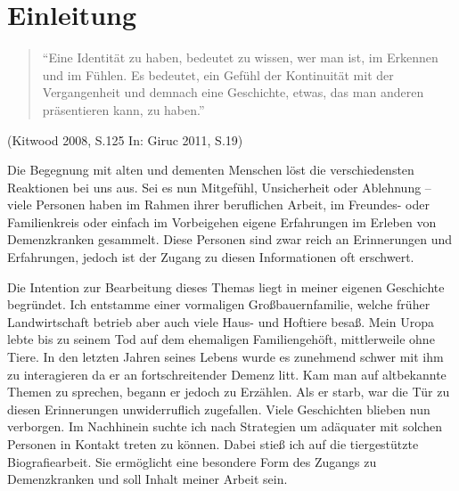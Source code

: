 \section{Einleitung}
\label{sec:k1_Einleitung}

\begin{quotation}
"`Eine Identität zu haben, bedeutet zu wissen, wer man ist, im Erkennen und im Fühlen. Es bedeutet, ein Gefühl der Kontinuität mit der Vergangenheit und demnach eine Geschichte, etwas, das man anderen präsentieren kann, zu haben."'
\end{quotation}

\begin{flushright}
(Kitwood 2008, S.125 In: Giruc 2011, S.19)
\end{flushright}

Die Begegnung mit alten und dementen Menschen löst die verschiedensten Reaktionen bei uns aus. Sei es nun Mitgefühl, Unsicherheit oder Ablehnung -- viele Personen haben im Rahmen ihrer beruflichen Arbeit, im Freundes- oder Familienkreis oder einfach im Vorbeigehen eigene Erfahrungen im Erleben von Demenzkranken gesammelt. Diese Personen sind zwar reich an Erinnerungen und Erfahrungen, jedoch ist der Zugang zu diesen Informationen oft erschwert.
 
Die Intention zur Bearbeitung dieses Themas liegt in meiner eigenen Geschichte begründet. Ich entstamme einer vormaligen Großbauernfamilie, welche früher Landwirtschaft betrieb aber auch viele Haus- und Hoftiere besaß. Mein Uropa lebte bis zu seinem Tod auf dem ehemaligen Familiengehöft, mittlerweile ohne Tiere. In den letzten Jahren seines Lebens wurde es zunehmend schwer mit ihm zu interagieren da er an fortschreitender Demenz litt. Kam man auf altbekannte Themen zu sprechen, begann er jedoch zu Erzählen. Als er starb, war die Tür zu diesen Erinnerungen unwiderruflich zugefallen. Viele Geschichten blieben nun verborgen. Im Nachhinein suchte ich nach Strategien um adäquater mit solchen Personen in Kontakt treten zu können. Dabei stieß ich auf die tiergestützte Biografiearbeit. Sie ermöglicht eine besondere Form des Zugangs zu Demenzkranken und soll Inhalt meiner Arbeit sein.

